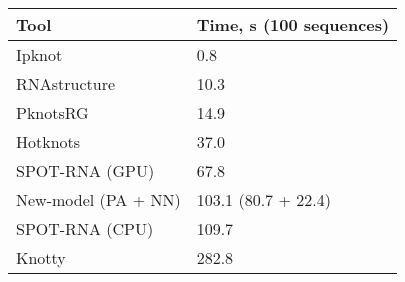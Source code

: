 \begin{table}[h]
\centering
\begin{tabular}{|p{5.5cm}||p{4.5cm}|}
\hline
\textbf{Tool} & \textbf{Time, s (100 sequences)} \\ \hline\hline
Ipknot & 0.8 \\ \hline
RNAstructure & 10.3 \\ \hline
PknotsRG & 14.9 \\ \hline
Hotknots & 37.0 \\ \hline
SPOT-RNA (GPU) & 67.8 \\ \hline
New-model (PA + NN) & 103.1 (80.7 + 22.4) \\ \hline
SPOT-RNA (CPU) & 109.7 \\ \hline
Knotty & 282.8 \\ \hline
\end{tabular}
\end{table}